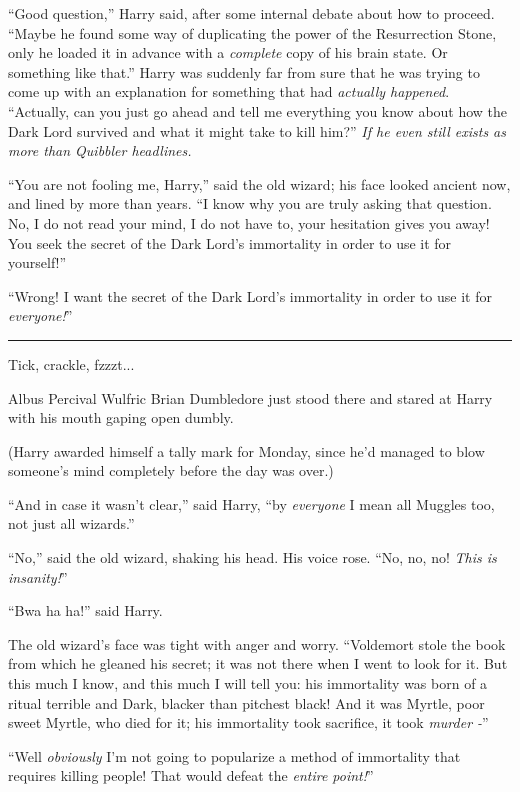 ``Good question,'' Harry said, after some internal debate about how to proceed. ``Maybe he found some way of duplicating the power of the Resurrection Stone, only he loaded it in advance with a \emph{complete} copy of his brain state. Or something like that.'' Harry was suddenly far from sure that he was trying to come up with an explanation for something that had \emph{actually happened}. ``Actually, can you just go ahead and tell me everything you know about how the Dark Lord survived and what it might take to kill him?'' \emph{If he even still exists as more than Quibbler headlines.}

``You are not fooling me, Harry,'' said the old wizard; his face looked ancient now, and lined by more than years. ``I know why you are truly asking that question. No, I do not read your mind, I do not have to, your hesitation gives you away! You seek the secret of the Dark Lord's immortality in order to use it for yourself!''

``Wrong! I want the secret of the Dark Lord's immortality in order to use it for \emph{everyone!}''

\begin{center}\rule{3in}{0.4pt}\end{center}

Tick, crackle, fzzzt...

Albus Percival Wulfric Brian Dumbledore just stood there and stared at Harry with his mouth gaping open dumbly.

(Harry awarded himself a tally mark for Monday, since he'd managed to blow someone's mind completely before the day was over.)

``And in case it wasn't clear,'' said Harry, ``by \emph{everyone} I mean all Muggles too, not just all wizards.''

``No,'' said the old wizard, shaking his head. His voice rose. ``No, no, no! \emph{This is insanity!}''

``Bwa ha ha!'' said Harry.

The old wizard's face was tight with anger and worry. ``Voldemort stole the book from which he gleaned his secret; it was not there when I went to look for it. But this much I know, and this much I will tell you: his immortality was born of a ritual terrible and Dark, blacker than pitchest black! And it was Myrtle, poor sweet Myrtle, who died for it; his immortality took sacrifice, it took \emph{murder -}''

``Well \emph{obviously} I'm not going to popularize a method of immortality that requires killing people! That would defeat the \emph{entire point!}''


